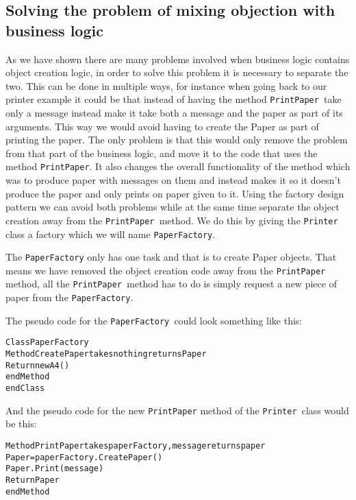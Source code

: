 \subsection*{Solving the problem of mixing objection with business logic}

As we have shown there are many problems involved when business logic
contains object creation logic, in order to solve this problem it
is necessary to separate the two. This can be done in multiple ways,
for instance when going back to our printer example it could be that
instead of having the method \texttt{PrintPaper }take only a message
instead make it take both a message and the paper as part of its arguments.
This way we would avoid having to create the Paper as part of printing
the paper. The only problem is that this would only remove the problem
from that part of the business logic, and move it to the code that
uses the method \texttt{PrintPaper}. It also changes the overall functionality
of the method which was to produce paper with messages on them and
instead makes it so it doesn\textquoteright{}t produce the paper and
only prints on paper given to it. Using the factory design pattern
we can avoid both problems while at the same time separate the object
creation away from the \texttt{PrintPaper }method. We do this by giving
the \texttt{Printer }class a factory which we will name \texttt{PaperFactory}.

The \texttt{PaperFactory} only has one task and that is to create
Paper objects. That means we have removed the object creation code
away from the \texttt{PrintPaper }method, all the \texttt{PrintPaper
}method has to do is simply request a new piece of paper from the
\texttt{PaperFactory}.

The pseudo code for the \texttt{PaperFactory }could look something
like this:

\begin{alltt}
Class PaperFactory 	
    Method CreatePaper takes nothing returns Paper
        Return new A4() 
    endMethod 
endClass
\end{alltt}

And the pseudo code for the new \texttt{PrintPaper} method of the
\texttt{Printer }class would be this:

\begin{alltt}
Method PrintPaper takes paperFactory, message returns paper
    Paper = paperFactory.CreatePaper()
    Paper.Print(message) 	
    Return Paper 
endMethod	
\end{alltt}

